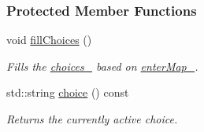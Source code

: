 \subsubsection*{Protected Member Functions}
\begin{DoxyCompactItemize}
\item 
void \hyperlink{structMenuBase_ae8116c5d8732c2efb50c0329a320c060}{fill\+Choices} ()\hypertarget{structMenuBase_ae8116c5d8732c2efb50c0329a320c060}{}\label{structMenuBase_ae8116c5d8732c2efb50c0329a320c060}

\begin{DoxyCompactList}\small\item\em Fills the \hyperlink{structMenuBase_a6b523c65a4ee64bf0f9bd52d723404b0}{choices\+\_\+} based on \hyperlink{structMenuBase_ae9b5da9e2b53f658e398a1ade0f12966}{enter\+Map\+\_\+}. \end{DoxyCompactList}\item 
std\+::string \hyperlink{structMenuBase_af8a29688a6d52fd59e8049bfdf7e7021}{choice} () const 
\begin{DoxyCompactList}\small\item\em Returns the currently active choice. \end{DoxyCompactList}\end{DoxyCompactItemize}
